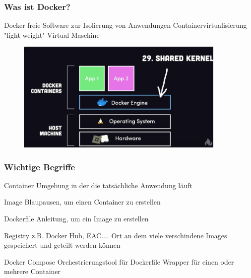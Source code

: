 \documentclass[22pt]{beamer}
\begin{document}
\begin{frame}[t]
    \frametitle{Was ist Docker?}
    \begin{block}{Docker}
        freie Software zur Isolierung von Anwendungen\newline
        Containervirtualisierung\newline
        "light weight" Virtual Maschine\newline
    \end{block}
    \begin{figure}[h]
        \centering
        \includegraphics[width=0.9\textwidth]{Bilder/Docker Concept.png}
    \end{figure}
\end{frame}


\begin{frame}[t]
    \frametitle{Wichtige Begriffe}
    
    \begin{block}{Container}
        Umgebung in der die tatsächliche Anwendung läuft
    \end{block}
    \begin{block}{Image}
        Blaupausen, um einen Container zu erstellen
    \end{block}
    \begin{block}{Dockerfile}
        Anleitung, um ein Image zu erstellen
    \end{block}
    \begin{block}{Registry}
        z.B. Docker Hub, EAC....
        Ort an dem viele verschindene Images gespeichert und geteilt werden können
    \end{block}
    \begin{block}{Docker Compose}
        Orchestrierungstool für Dockerfile\newline
        Wrapper für einen oder mehrere Container
    \end{block}
\end{frame}
\end{document}
